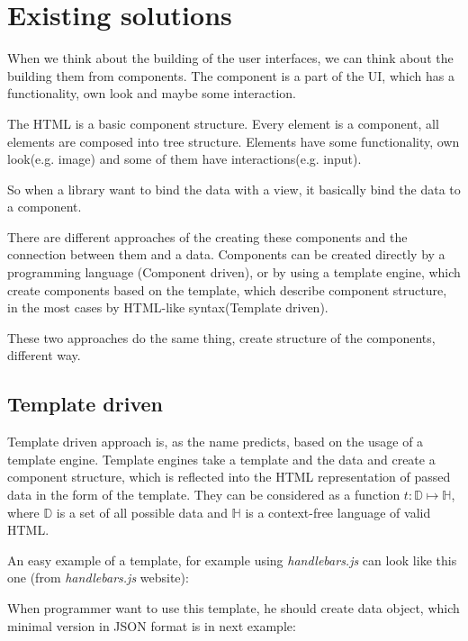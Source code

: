 \chapter{Existing solutions}\label{chap:existing}

When we think about the building of the user interfaces, we can think about the building them from components.
The component is a part of the UI, which has a functionality, own look and maybe some interaction.

The HTML is a basic component structure. Every element is a component, all elements are composed into tree structure. 
Elements have some functionality, own look(e.g. image) and some of them have interactions(e.g. input).

So when a library want to bind the data with a view, it basically bind the data to a component.

There are different approaches of the creating these components and the connection between them and a data. 
Components can be created directly by a programming language (Component driven), 
or by using a template engine, which create components based on the template, 
which describe component structure, in the most cases by HTML-like syntax(Template driven).

These two approaches do the same thing, create structure of the components, different way.

\section{Template driven}\label{sec:existing-template}

  Template driven approach is, as the name predicts, based on the usage of a template engine. 
  Template engines take a template and the data and create a component structure, 
  which is reflected into the HTML representation of passed data in the form of the template. 
  They can be considered as a function $t:\mathbb D\mapsto\mathbb H$, 
  where $\mathbb D$ is a set of all possible data and $\mathbb H$ is a context-free language of valid HTML.

  An easy example of a template, for example using \textit{handlebars.js} can look like this one (from \textit{handlebars.js} website):
  

  When programmer want to use this template, he should create data object, which minimal version in JSON format is in next example:
  

